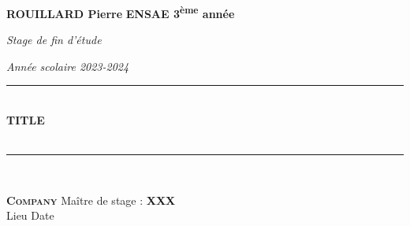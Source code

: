 \newcommand{\HRule}{\rule{\linewidth}{0.5mm}}

\begin{titlepage}
\begin{center}

\begin{minipage}{1\textwidth}
\Large{\textbf{ROUILLARD Pierre}} 
\hfill
\large{\textbf{ENSAE 3\textsuperscript{ème} année}}\par
\vspace{0cm}
\hfill \normalsize{\textit{Stage de fin d'étude}}\par
\hfill \normalsize{\textit{Année scolaire 2023-2024}}  
\end{minipage}

\vspace{8cm}



\begin{center}
\HRule \\[.8cm]
{\huge{\bfseries{TITLE}}\\ }\\[0.5cm]
\HRule \\[2.5cm]
\end{center}

\vfill
\begin{minipage}{1\textwidth}
\begin{flushleft}

\large{\textbf{\textsc{Company}}} \hfill \small{Maître de stage :} \large{\textbf{\textsc{XXX}}} \\ 
\small{Lieu} \hfill \small{Date}

\end{flushleft}
\end{minipage}


\end{center}
\end{titlepage}